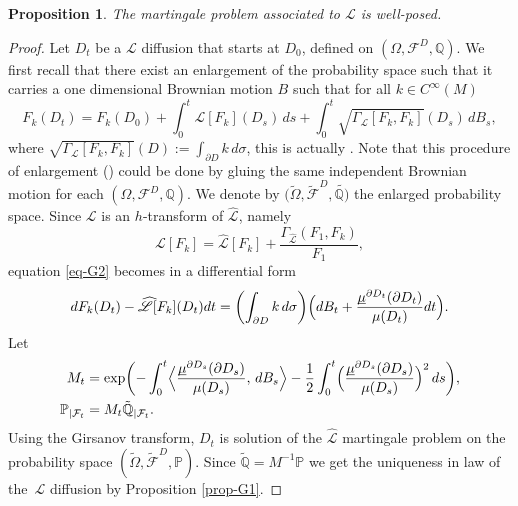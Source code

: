 \documentclass[10pt]{amsart}
\theoremstyle{plain}
\newtheorem{prop}[thm]{Proposition}
\theoremstyle{definition}
\newcommand{\SL}{{\mathscr L}}
\newcommand{\usm}{{\underline{\smash{\mu}}}}
\begin{document}
\begin{prop}\label{prop-G2}
The martingale problem associated to $\SL$ is well-posed.
\end{prop}
\begin{proof}
Let $D_t$ be a $\SL $ diffusion that starts at $D_0$, defined on $(\Omega,\mathcal{F}^D,\mathbb{Q})$. We first recall that there exist an enlargement of the probability space such that it carries a one dimensional Brownian motion $ B$ such that for all $ k \in C^{\infty}(M) $\vspace*{-3pt}
\begin{equation}\label{eq-G2}
F_k(D_t)=F_k(D_0)+\int_0^t \SL[F_k](D_s)\,ds +\int_0^t\sqrt{\Gamma_{\SL}[F_k,F_k]}(D_s)\, dB_s,
\end{equation}
where $\sqrt{\Gamma_{\SL}[F_k,F_k]}(D):= \int_{\partial D} k\, d\sigma $, this is actually \cite[Prop.\,53]{zbMATH07470497}. Note that this procedure of enlargement (\cite[Chap.\,V, Th.\,1.7]{MR1725357}) could be done by gluing the same independent Brownian motion for each $(\Omega,\mathcal{F}^D,\mathbb{Q})$. We denote by $ (\tilde{\Omega},\tilde{\mathcal{F}}^D,\tilde{\mathbb{Q})}$ the enlarged probability space. Since $\SL $ is an $h$-transform of $\widehat{\SL}$, namely\vspace*{-3pt}
\[
\SL[F_k] = \widehat{\SL}[F_k] +\frac{\Gamma_{\widehat{\SL}}( F_1,F_k)}{F_1},
\]
equation \eqref{eq-G2} becomes in a differential form\vspace*{-3pt}
\begin{equation}%
dF_k(D_t)- \widehat{\SL}[F_k](D_t) dt = \biggl(\int_{\partial D} k\, d\sigma\biggr)\Bigl(dB_t + \frac{\usm^{\partial D_t}(\partial D_t)}{\mu(D_t)}dt\Bigr).
\end{equation}
Let\vspace*{-3pt}
\begin{align*}
M_t &= \exp\biggl(-\int_0^t \Bigl\langle \frac{\usm^{\partial D_s}(\partial D_s)}{\mu(D_s)}, \, dB_s \Bigr\rangle -\frac12 \int_0^t\Bigl(\frac{\usm^{\partial D_s}(\partial D_s)}{\mu(D_s)} \Bigr)^2 \,ds\biggr),
\\
\mathbb{P}_{\vert \mathcal{F}_t} &= M_t\tilde{\mathbb{Q}}_{\vert \mathcal{F}_t}.
\end{align*}
Using the Girsanov transform, $D_t $ is solution of the $\widehat{\SL} $ martingale problem on the probability space $ (\tilde{\Omega},\tilde{\mathcal{F}}^D,\mathbb{P})$. Since $ \tilde{\mathbb{Q}} = M^{-1}\mathbb{P}$ we get the uniqueness in law of the~$\SL $ diffusion by Proposition \ref{prop-G1}.
\end{proof}
\end{document}
